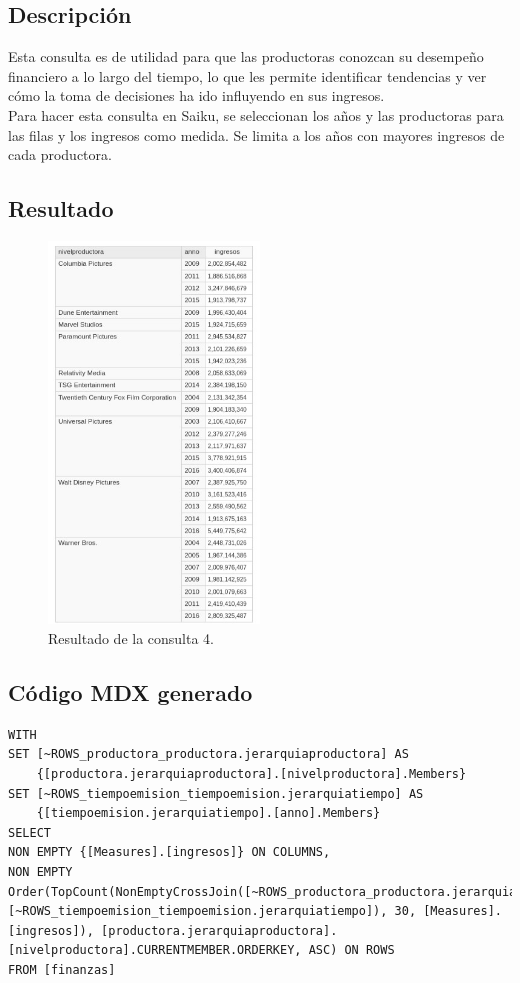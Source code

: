 \documentclass[11pt]{opticajnl}
\begin{document}
\subsection{Descripción}

Esta consulta es de utilidad para que las productoras conozcan su desempeño financiero a lo largo del tiempo, lo que les permite identificar tendencias y ver cómo la toma de decisiones ha ido influyendo en sus ingresos. \\

Para hacer esta consulta en Saiku, se seleccionan los años y las productoras para las filas y los ingresos como medida. Se limita a los años con mayores ingresos de cada productora.

\subsection{Resultado}

\begin{figure}[h]
\centering
\includegraphics[width=0.5\textwidth]{fotos/con4.jpg}
\caption{Resultado de la consulta 4.}
\end{figure}

\subsection{Código MDX generado}

\begin{lstlisting}[style=terminal] 
WITH
SET [~ROWS_productora_productora.jerarquiaproductora] AS
	{[productora.jerarquiaproductora].[nivelproductora].Members}
SET [~ROWS_tiempoemision_tiempoemision.jerarquiatiempo] AS
	{[tiempoemision.jerarquiatiempo].[anno].Members}
SELECT
NON EMPTY {[Measures].[ingresos]} ON COLUMNS,
NON EMPTY Order(TopCount(NonEmptyCrossJoin([~ROWS_productora_productora.jerarquiaproductora], [~ROWS_tiempoemision_tiempoemision.jerarquiatiempo]), 30, [Measures].[ingresos]), [productora.jerarquiaproductora].[nivelproductora].CURRENTMEMBER.ORDERKEY, ASC) ON ROWS
FROM [finanzas]
\end{lstlisting}
\end{document}
